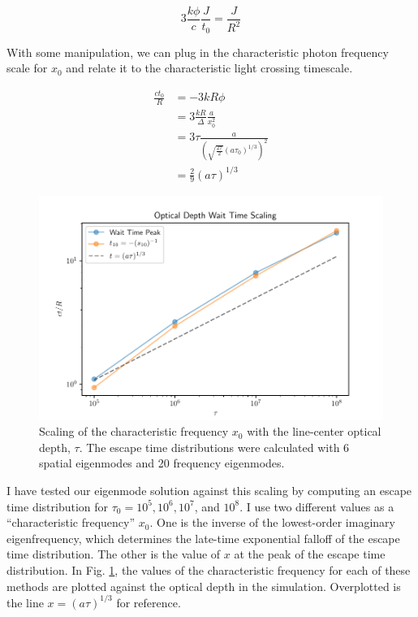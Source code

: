 \documentclass[onecolumn]{aastex63}
\begin{document}
\begin{equation}
    3\frac{k\phi}{c}\frac{J}{t_0} = \frac{J}{R^2}
\end{equation}

\noindent With some manipulation, we can plug in the characteristic photon frequency scale for $x_0$ and relate it to the characteristic light crossing timescale.

\begin{equation}
    \begin{split}
    \frac{ct_0}{R} &= -3kR\phi \\
    &= 3\frac{kR}{\Delta}\frac{a}{x_0^2}\\
    &= 3\tau \frac{a}{\left(\sqrt{\frac{27}{2}}\left(a\tau_0\right)^{1/3}\right)^2}\\
    &= \frac{2}{9}\left(a\tau\right)^{1/3}
    \end{split}
\end{equation}

\begin{figure}
    \centering
    \includegraphics[width=\textwidth]{tau_scaling.pdf}
    \caption{Scaling of the characteristic frequency $x_0$ with the line-center optical depth, $\tau$. The escape time distributions were calculated with 6 spatial eigenmodes and 20 frequency eigenmodes.}
    \label{tau_scaling}
\end{figure}

\noindent I have tested our eigenmode solution against this scaling by computing an escape time distribution for $\tau_0 = 10^5, 10^6, 10^7$, and $10^8$. I use two different values as a ``characteristic frequency'' $x_0$. One is the inverse of the lowest-order imaginary eigenfrequency, which determines the late-time exponential falloff of the escape time distribution. The other is the value of $x$ at the peak of the escape time distribution. In Fig. \ref{tau_scaling}, the values of the characteristic frequency for each of these methods are plotted against the optical depth in the simulation. Overplotted is the line $x = (a\tau)^{1/3}$ for reference.
\end{document}
